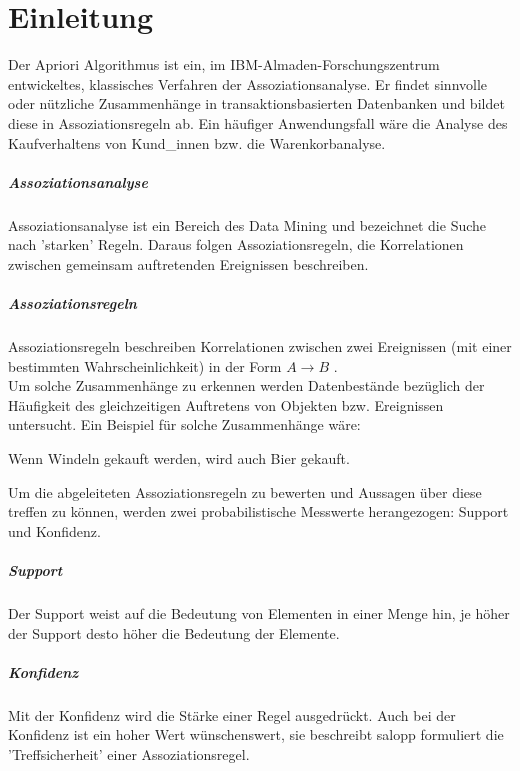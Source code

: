 \chapter{Einleitung}
\label{chap:einleitung}

Der Apriori Algorithmus ist ein, im IBM-Almaden-Forschungszentrum entwickeltes, klassisches Verfahren der Assoziationsanalyse. Er findet sinnvolle oder nützliche Zusammenhänge in transaktionsbasierten Datenbanken und bildet diese in Assoziationsregeln ab. Ein häufiger Anwendungsfall wäre die Analyse des Kaufverhaltens von Kund\_innen bzw. die Warenkorbanalyse.
\parencite [s.][S. 109, S.112] {Datawarehouse}


\paragraph{Assoziationsanalyse}
Assoziationsanalyse ist ein Bereich des Data Mining und bezeichnet die Suche nach 'starken' Regeln. Daraus folgen Assoziationsregeln, die Korrelationen zwischen gemeinsam auftretenden Ereignissen beschreiben.

\paragraph{Assoziationsregeln}
Assoziationsregeln beschreiben Korrelationen zwischen zwei Ereignissen (mit einer bestimmten Wahrscheinlichkeit) in der Form $ A \rightarrow B $ .\\
Um solche Zusammenhänge zu erkennen werden Datenbestände bezüglich der Häufigkeit des gleichzeitigen Auftretens von Objekten bzw. Ereignissen untersucht.\parencite [s.][S.110]{Datawarehouse}
Ein Beispiel für solche Zusammenhänge wäre:

Wenn Windeln gekauft werden, wird auch Bier gekauft.

Um die abgeleiteten Assoziationsregeln zu bewerten und Aussagen über diese treffen zu können, werden zwei probabilistische Messwerte herangezogen: Support und Konfidenz.

\paragraph{Support}
Der Support weist auf die Bedeutung von Elementen in einer Menge hin, je höher der Support desto höher die Bedeutung der Elemente.
\parencite [s.][S.110]{Datawarehouse}

\paragraph{Konfidenz}
Mit der Konfidenz wird die Stärke einer Regel ausgedrückt. Auch bei der Konfidenz ist ein hoher Wert wünschenswert, sie beschreibt salopp formuliert die 'Treffsicherheit' einer Assoziationsregel.
\parencite [s.][S.110]{Datawarehouse}

